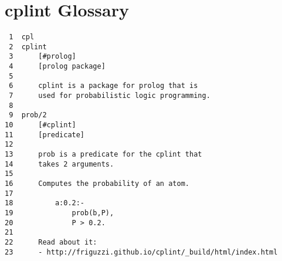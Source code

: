 \documentclass[11pt]{article}
\begin{document}
\section{cplint Glossary}
\label{sec:org279898b}

\begin{verbatim}
 1  cpl
 2  cplint
 3      [#prolog]
 4      [prolog package]
 5  
 6      cplint is a package for prolog that is
 7      used for probabilistic logic programming.
 8  
 9  prob/2
10      [#cplint]
11      [predicate]
12  
13      prob is a predicate for the cplint that
14      takes 2 arguments.
15  
16      Computes the probability of an atom.
17  
18          a:0.2:-
19              prob(b,P),
20              P > 0.2.
21  
22      Read about it:
23      - http://friguzzi.github.io/cplint/_build/html/index.html
\end{verbatim}
\end{document}
